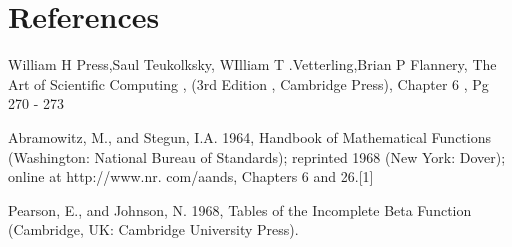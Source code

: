 \documentclass[12pt,letterpaper]{article}
\begin{document}
\section*{References}

William H Press,Saul Teukolksky, WIlliam T .Vetterling,Brian P Flannery, The Art of Scientific Computing , (3rd Edition , Cambridge Press), Chapter 6 , Pg 270 - 273

    Abramowitz, M., and Stegun, I.A. 1964, Handbook of Mathematical Functions (Washington: National
Bureau of Standards); reprinted 1968 (New York: Dover); online at http://www.nr.
com/aands, Chapters 6 and 26.[1]

Pearson, E., and Johnson, N. 1968, Tables of the Incomplete Beta Function (Cambridge, UK:
Cambridge University Press).
\end{document}
